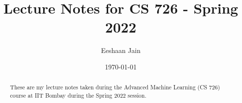 \documentclass[notoc,numbers]{tufte-handout}
\title{Lecture Notes for CS 726 - Spring 2022}
\author[Eeshaan Jain]{Eeshaan Jain}
\date{\today}  %
\theoremstyle{definition}
\theoremstyle{remark}
\begin{document}
	
	\maketitle
	\begin{abstract}
		These are my lecture notes taken during the Advanced Machine Learning (CS 726) course at IIT Bombay during the Spring 2022 session.	\end{abstract}
	\tableofcontents
	\vspace{5mm}
	\listofalgorithms
	\newpage
	
	
	
	
\end{document}
